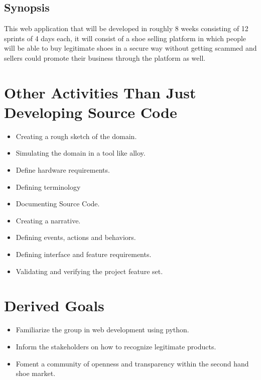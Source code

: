\subsection{Synopsis}
This web application that will be developed in roughly 8 weeks consisting of 12 sprints of 4 days each, it will consist of a shoe selling platform in which people will be able to buy legitimate shoes in a secure way without getting scammed and sellers could promote their business through the platform as well.
\section{Other Activities Than Just Developing Source Code}
\begin{itemize}
  \item Creating a rough sketch of the domain.
  \item Simulating the domain in a tool like alloy.
  \item Define hardware requirements.
  \item Defining terminology
  \item Documenting Source Code.
  \item Creating a narrative.
  \item Defining events, actions and behaviors.
  \item Defining interface and feature requirements.
  \item Validating and verifying the project feature set.
\end{itemize}
\section{Derived Goals}
\begin{itemize}
  \item Familiarize the group in web development using python.
  \item Inform the stakeholders on how to recognize legitimate products.
  \item Foment a community of openness and transparency within the second hand shoe market.
\end{itemize}
